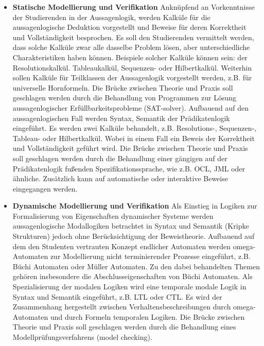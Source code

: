 \begin{module}
\begin{content}
 \begin{itemize}\item \textbf{Statische Modellierung und Verifikation}\newline
Anknüpfend an Vorkenntnisse der Studierenden in der Aussagenlogik, werden Kalküle für die aussagenlogische Deduktion vorgestellt und Beweise für deren Korrektheit und Vollständigkeit besprochen. Es soll den Studierenden vermittelt werden, dass solche Kalküle zwar alle dasselbe Problem lösen, aber unterschiedliche Charakteristiken haben können. Beispiele solcher Kalküle können sein: der Resolutionskalkül. Tableaukalkül, Sequenzen- oder Hilbertkalkül. Weiterhin sollen Kalküle für Teilklassen der Aussagenlogik vorgestellt werden, z.B. für universelle Hornformeln.\newline
Die Brücke zwischen Theorie und Praxis soll geschlagen werden durch die Behandlung von Programmen zur Lösung aussagenlogischer Erfüllbarkeitsprobleme (SAT-solver).\newline
\newline
Aufbauend auf den aussagenlogischen Fall werden Syntax, Semantik der Prädikatenlogik eingeführt. Es werden zwei Kalküle behandelt, z.B. Resolutions-, Sequenzen-, Tableau- oder Hilbertkalkül. Wobei in einem Fall ein Beweis der Korrektheit und Vollständigkeit geführt wird.\newline
Die Brücke zwischen Theorie und Praxis soll geschlagen werden durch die Behandlung einer gängigen auf der Prädikatenlogik fußenden Spezifikationssprache, wie z.B. OCL, JML oder ähnliche. Zusätzlich kann auf automatische oder interaktive Beweise eingegangen werden.  \end{itemize}\begin{itemize}\item \textbf{Dynamische Modellierung und Verifikation}\newline
Als Einstieg in Logiken zur Formalisierung von Eigenschaften dynamischer Systeme werden aussagenlogische Modallogiken betrachtet in Syntax und Semantik (Kripke Strukturen) jedoch ohne Berücksichtigung der Beweistheorie.\newline
Aufbauend auf dem den Studenten vertrauten Konzept endlicher Automaten werden omega-Automaten zur Modellierung nicht terminierender Prozesse eingeführt, z.B. Büchi Automaten oder Müller Automaten. Zu den dabei behandelten Themen gehören insbesondere die Abschlusseigenschaften von Büchi Automaten.\newline
Als Spezialisierung der modalen Logiken wird eine temporale modale Logik in Syntax und Semantik eingeführt, z.B. LTL oder CTL.\newline
Es wird der Zusammenhang hergestellt zwischen Verhaltensbeschreibungen durch omega-Automaten und durch Formeln temporalen Logiken.\newline
Die Brücke zwischen Theorie und Praxis soll geschlagen werden durch die Behandlung eines Modellprüfungsverfahrens (model checking).  \end{itemize}
\end{content}


\end{module}
